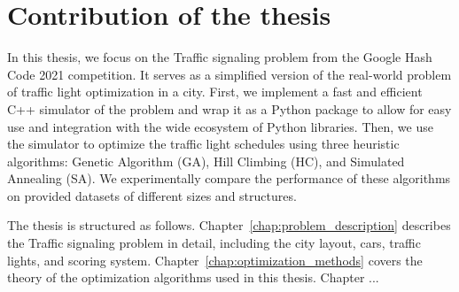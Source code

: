 \section*{Contribution of the thesis}


In this thesis, we focus on the Traffic signaling problem from the Google Hash Code 2021 competition. It serves as a simplified version of the real-world problem of traffic light optimization in a city. First, we implement a fast and efficient C++ simulator of the problem and wrap it as a Python package to allow for easy use and integration with the wide ecosystem of Python libraries. Then, we use the simulator to optimize the traffic light schedules using three heuristic algorithms: Genetic Algorithm (GA), Hill Climbing (HC), and Simulated Annealing (SA). We experimentally compare the performance of these algorithms on provided datasets of different sizes and structures.

The thesis is structured as follows. Chapter~\ref{chap:problem_description} describes the Traffic signaling problem in detail, including the city layout, cars, traffic lights, and scoring system. Chapter~\ref{chap:optimization_methods} covers the theory of the optimization algorithms used in this thesis. Chapter ...


